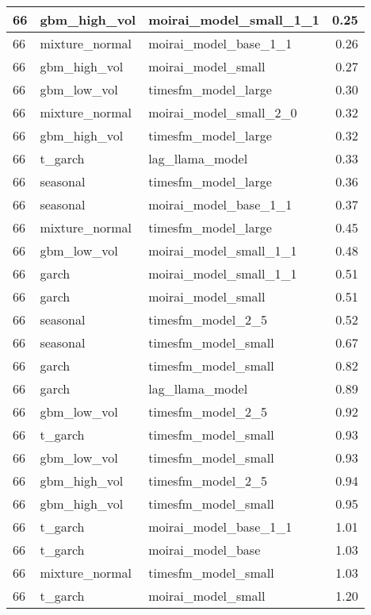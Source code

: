 {\begin{tabular}{lllr}
\midrule
66 & gbm\_high\_vol & moirai\_model\_small\_1\_1 & 0.25 \\
\midrule
66 & mixture\_normal & moirai\_model\_base\_1\_1 & 0.26 \\
\midrule
66 & gbm\_high\_vol & moirai\_model\_small & 0.27 \\
\midrule
66 & gbm\_low\_vol & timesfm\_model\_large & 0.30 \\
\midrule
66 & mixture\_normal & moirai\_model\_small\_2\_0 & 0.32 \\
\midrule
66 & gbm\_high\_vol & timesfm\_model\_large & 0.32 \\
\midrule
66 & t\_garch & lag\_llama\_model & 0.33 \\
\midrule
66 & seasonal & timesfm\_model\_large & 0.36 \\
\midrule
66 & seasonal & moirai\_model\_base\_1\_1 & 0.37 \\
\midrule
66 & mixture\_normal & timesfm\_model\_large & 0.45 \\
\midrule
66 & gbm\_low\_vol & moirai\_model\_small\_1\_1 & 0.48 \\
\midrule
66 & garch & moirai\_model\_small\_1\_1 & 0.51 \\
\midrule
66 & garch & moirai\_model\_small & 0.51 \\
\midrule
66 & seasonal & timesfm\_model\_2\_5 & 0.52 \\
\midrule
66 & seasonal & timesfm\_model\_small & 0.67 \\
\midrule
66 & garch & timesfm\_model\_small & 0.82 \\
\midrule
66 & garch & lag\_llama\_model & 0.89 \\
\midrule
66 & gbm\_low\_vol & timesfm\_model\_2\_5 & 0.92 \\
\midrule
66 & t\_garch & timesfm\_model\_small & 0.93 \\
\midrule
66 & gbm\_low\_vol & timesfm\_model\_small & 0.93 \\
\midrule
66 & gbm\_high\_vol & timesfm\_model\_2\_5 & 0.94 \\
\midrule
66 & gbm\_high\_vol & timesfm\_model\_small & 0.95 \\
\midrule
66 & t\_garch & moirai\_model\_base\_1\_1 & 1.01 \\
\midrule
66 & t\_garch & moirai\_model\_base & 1.03 \\
\midrule
66 & mixture\_normal & timesfm\_model\_small & 1.03 \\
\midrule
66 & t\_garch & moirai\_model\_small & 1.20 \\

\end{tabular}}

